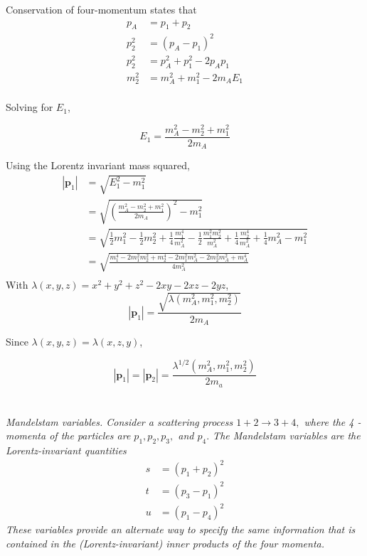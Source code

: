 \documentclass{article}
\begin{document}
Conservation of four-momentum states that
\begin{align*}
p_{A} &=p_{1}+p_{2} \\
p_{2}^{2} &=\left(p_{A}-p_{1}\right)^{2} \\
p_{2}^{2}&=p_{A}^{2}+p_{1}^{2}-2 p_{A} p_{1}\\
m_{2}^{2}&=m_{A}^{2}+m_{1}^{2}-2 m_{A} E_{1} \\
\end{align*}

Solving for $E_1$,

\begin{equation*}
E_{1}=\frac{m_{A}^{2}-m_{2}^{2}+m_{1}^{2}}{2 m_{A}}
\end{equation*}

Using the Lorentz invariant mass squared,
\begin{align*}
    \left|\mathbf{p}_{1}\right|&=\sqrt{E_{1}^{2}-m_{1}^{2}}\\
    &=\sqrt{\left(\frac{m_{A}^{2}-m_{2}^{2}+m_{1}^{2}}{2 m_{A}}\right)^{2}-m_{1}^{2}}\\
    &= \sqrt{\frac{1}{2} m_{1}^{2}-\frac{1}{2} m_{2}^{2}+\frac{1}{4} \frac{m_{1}^{4}}{m_{A}^{2}}-\frac{1}{2} \frac{m_{1}^{2} m_{2}^{2}}{m_{A}^{2}}+\frac{1}{4} \frac{m_{2}^{4}}{m_{A}^{2}}+\frac{1}{4} m_{A}^{2}-m_{1}^{2}}\\
    &=\sqrt{\frac{m_{1}^{4}-2 m_{1}^{2} m_{2}^{2}+m_{2}^{4}-2 m_{1}^{2} m_{A}^{2}-2 m_{2}^{2} m_{A}^{2}+m_{A}^{4}}{4 m_{A}^{2}}}\\
\end{align*}
With $\lambda(x, y, z)=x^{2}+y^{2}+z^{2}-2 x y-2 x z-2 y z$, 
\begin{equation*}
    \left|\mathbf{p}_{1}\right|=\frac{\sqrt{\lambda\left(m_{A}^{2}, m_{1}^{2}, m_{2}^{2}\right)}}{2 m_{A}}
\end{equation*}

Since $\lambda(x, y, z) =\lambda(x, z, y)$,

$$
\boxed{
\left|\mathbf{p}_{1}\right|=\left|\mathbf{p}_{2}\right|=\frac{\lambda^{1 / 2}\left(m_{A}^{2}, m_{1}^{2}, m_{2}^{2}\right)}{2 m_{a}}}
$$

\newpage


\section{}
\textit{Mandelstam variables. Consider a scattering process $1+2 \rightarrow 3+4,$ where the 4 -momenta of the particles are $p_{1}, p_{2}, p_{3},$ and $p_{4} .$ The Mandelstam variables are the Lorentz-invariant quantities
$$
\begin{aligned}
s &=\left(p_{1}+p_{2}\right)^{2} \\
t &=\left(p_{3}-p_{1}\right)^{2} \\
u &=\left(p_{1}-p_{4}\right)^{2}
\end{aligned}
$$
These variables provide an alternate way to specify the same information that is contained in the (Lorentz-invariant) inner products of the four momenta.}
\end{document}
